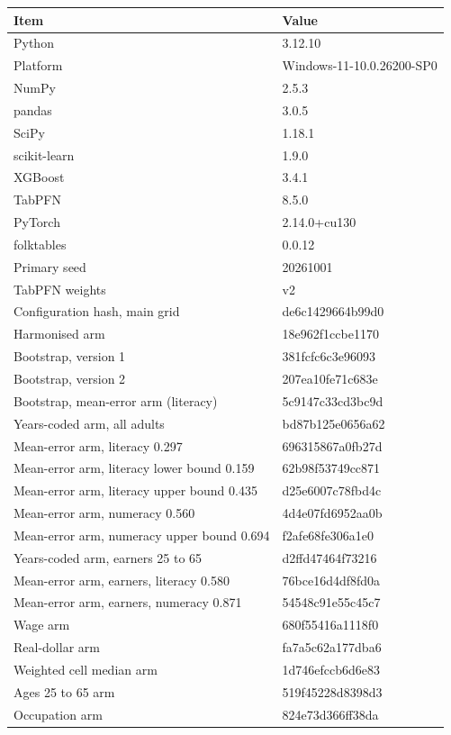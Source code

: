 \setlength{\tabcolsep}{4pt}
\begin{tabular}{@{}ll@{}}
\toprule
Item & Value\\
\midrule
Python & 3.12.10\\
Platform & Windows-11-10.0.26200-SP0\\
NumPy & 2.5.3\\
pandas & 3.0.5\\
SciPy & 1.18.1\\
scikit-learn & 1.9.0\\
XGBoost & 3.4.1\\
TabPFN & 8.5.0\\
PyTorch & 2.14.0+cu130\\
folktables & 0.0.12\\
Primary seed & 20261001\\
TabPFN weights & v2\\
Configuration hash, main grid & de6c1429664b99d0\\
Harmonised arm & 18e962f1ccbe1170\\
Bootstrap, version 1 & 381fcfc6c3e96093\\
Bootstrap, version 2 & 207ea10fe71c683e\\
Bootstrap, mean-error arm (literacy) & 5c9147c33cd3bc9d\\
Years-coded arm, all adults & bd87b125e0656a62\\
Mean-error arm, literacy 0.297 & 696315867a0fb27d\\
Mean-error arm, literacy lower bound 0.159 & 62b98f53749cc871\\
Mean-error arm, literacy upper bound 0.435 & d25e6007c78fbd4c\\
Mean-error arm, numeracy 0.560 & 4d4e07fd6952aa0b\\
Mean-error arm, numeracy upper bound 0.694 & f2afe68fe306a1e0\\
Years-coded arm, earners 25 to 65 & d2ffd47464f73216\\
Mean-error arm, earners, literacy 0.580 & 76bce16d4df8fd0a\\
Mean-error arm, earners, numeracy 0.871 & 54548c91e55c45c7\\
Wage arm & 680f55416a1118f0\\
Real-dollar arm & fa7a5c62a177dba6\\
Weighted cell median arm & 1d746efccb6d6e83\\
Ages 25 to 65 arm & 519f45228d8398d3\\
Occupation arm & 824e73d366ff38da\\

\end{tabular}
